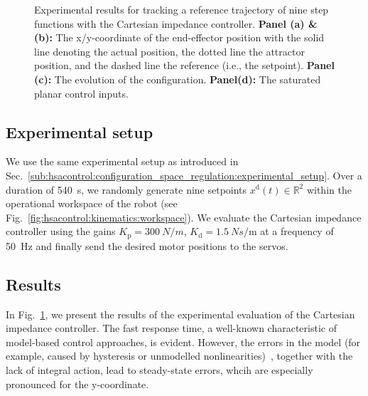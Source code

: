 \begin{figure}[t]
    \caption{Experimental results for tracking a reference trajectory of nine step functions with the Cartesian impedance controller. \textbf{Panel (a) \& (b):} The x/y-coordinate of the end-effector position with the solid line denoting the actual position, the dotted line the attractor position, and the dashed line the reference (i.e., the setpoint).
    \textbf{Panel (c):} The evolution of the configuration.
    \textbf{Panel(d):} The saturated planar control inputs. }\label{fig:hsacontrol:experimental_results:task_space_impedance_control}
\end{figure}

\subsection{Experimental setup}
We use the same experimental setup as introduced in Sec.~\ref{sub:hsacontrol:configuration_space_regulation:experimental_setup}.
Over a duration of \SI{540}{s}, we randomly generate nine setpoints $x^\mathrm{d}(t) \in \mathbb{R}^2$ within the operational workspace of the robot (see Fig.~\ref{fig:hsacontrol:kinematics:workspace}).
We evaluate the Cartesian impedance controller using the gains $K_\mathrm{p} = \SI{300}{N \per m}$, $K_\mathrm{d} = \SI{1.5}{N s \per \meter}$ at a frequency of \SI{50}{Hz} and finally send the desired motor positions to the servos.


\subsection{Results}
In Fig.~\ref{fig:hsacontrol:experimental_results:task_space_impedance_control}, we present the results of the experimental evaluation of the Cartesian impedance controller. 
The fast response time, a well-known characteristic of model-based control approaches, is evident. However, the errors in the model (for example, caused by hysteresis or unmodelled nonlinearities)~\cite{stolzle2024experimental}, together with the lack of integral action, lead to steady-state errors, whcih are especially pronounced for the y-coordinate.

